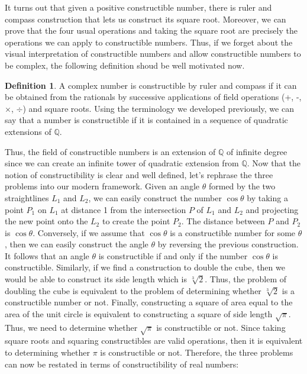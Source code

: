 \documentclass{article}
\theoremstyle{plain}
\theoremstyle{definition}
\newtheorem*{definition}{Definition}
\newcommand{\Q}{\mathbb{Q}}
\begin{document}
It turns out that given a positive constructible number, there is ruler and compass construction that lets us construct its square root. Moreover, we can prove that the four usual operations and taking the square root are precisely the operations we can apply to constructible numbers. Thus, if we forget about the visual interpretation of constructible numbers and allow constructible numbers to be complex, the following definition shoud be well motivated now.

\begin{definition}
    A complex number is constructible by ruler and compass if it can be obtained from the rationals by successive applications of field operations (+, -, $\times$, $\div$) and square roots. Using the terminology we developed previously, we can say that a number is constructible if it is contained in a sequence of quadratic extensions of $\Q$.
\end{definition}

Thus, the field of constructible numbers is an extension of $\Q$ of infinite degree since we can create an infinite tower of quadratic extension from $\Q$. Now that the notion of constructibility is clear and well defined, let's rephrase the three problems into our modern framework. Given an angle $\theta$ formed by the two straightlines $L_1$ and $L_2$, we can easily construct the number $\cos \theta$ by taking a point $P_1$ on $L_1$ at distance 1 from the intersection $P$ of $L_1$ and $L_2$ and projecting the new point onto the $L_2$ to create the point $P_2$. The distance between $P$ and $P_2$ is $\cos \theta$. Conversely, if we assume that $\cos \theta$ is a constructible number for some $\theta$, then we can easily construct the angle $\theta$ by reversing the previous construction. It follows that an angle $\theta$ is constructible if and only if the number $\cos \theta$ is constructible. Similarly, if we find a construction to double the cube, then we would be able to construct its side length which is $\sqrt[3]{2}$. Thus, the problem of doubling the cube is equivalent to the problem of determining whether $\sqrt[3]{2}$ is a constructible number or not. Finally, constructing a square of area equal to the area of the unit circle is equivalent to constructing a square of side length $\sqrt{\pi}$. Thus, we need to determine whether $\sqrt{\pi}$ is constructible or not. Since taking square roots and squaring constructibles are valid operations, then it is equivalent to determining whether $\pi$ is constructible or not. Therefore, the three problems can now be restated in terms of constructibility of real numbers:
\end{document}
